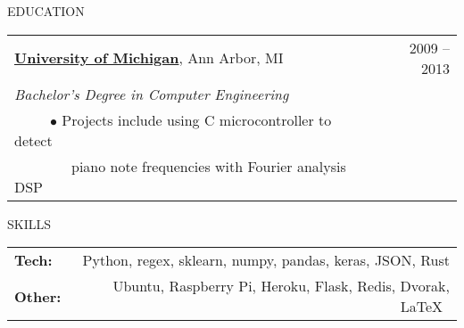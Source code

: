 \documentclass[11pt]{article}
\begin{document}
\vspace {.8cm}





{EDUCATION}
\vspace{0.4cm}

\begin{tabularx}{\linewidth}{l X r}
\textbf{\href{https://www.eecs.umich.edu/eecs/undergraduate/}{University of Michigan}}, Ann Arbor, MI & &  2009 -- 2013 \\
\emph{Bachelor's Degree in Computer Engineering} \\
~~~~~$\bullet$ Projects include using C microcontroller to detect  \\
~~~~~~~~piano note frequencies with Fourier analysis DSP\\
\end{tabularx}

\vspace {0.8cm}


{SKILLS}
\vspace{0.4cm}

\begin{tabularx}{\linewidth}{X r}
\textbf{Tech:} & Python, regex, sklearn, numpy, pandas, keras, JSON, Rust \\
\textbf{Other:} & Ubuntu, Raspberry Pi, Heroku, Flask, Redis, Dvorak,  \LaTeX \
\end{tabularx}
\end{document}
